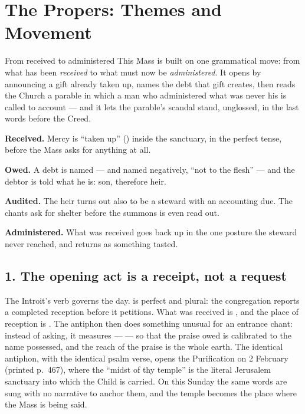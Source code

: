 \section{The Propers: Themes and Movement}

\begin{studybox}{From received to administered}
This Mass is built on one grammatical move: from what has been
\emph{received} to what must now be \emph{administered}. It opens by
announcing a gift already taken up, names the debt that gift creates, then
reads the Church a parable in which a man who administered what was never his
is called to account --- and it lets the parable's scandal stand, unglossed,
in the last words before the Creed.
\end{studybox}

\begin{movementlist}
\item \textbf{Received.}  Mercy is ``taken up''
() inside the sanctuary, in the perfect tense, before the
Mass asks for anything at all.
\item \textbf{Owed.}  A debt is named --- and named
negatively, ``not to the flesh'' --- and the debtor is told what he is: son,
therefore heir.
\item \textbf{Audited.}  The heir turns out
also to be a steward with an accounting due. The chants ask for shelter before
the summons is even read out.
\item \textbf{Administered.}  What was
received goes back up in the one posture the steward never reached, and
returns as something tasted.
\end{movementlist}

\subsection*{1. The opening act is a receipt, not a request
}

The Introit's verb governs the day.  is perfect and plural:
the congregation reports a completed reception before it petitions. What was
received is , and the place of reception is
. The antiphon then does something unusual for an
entrance chant: instead of asking, it measures ---  --- so that the praise owed is
calibrated to the name possessed, and the reach of the praise is the whole
earth. The identical antiphon, with the identical psalm verse, opens the
Purification on 2 February (printed p.\ 467), where the ``midst of thy
temple'' is the literal Jerusalem sanctuary into which the Child is carried.
On this Sunday the same words are sung with no narrative to anchor them, and
the temple becomes the place where the Mass is being said.

